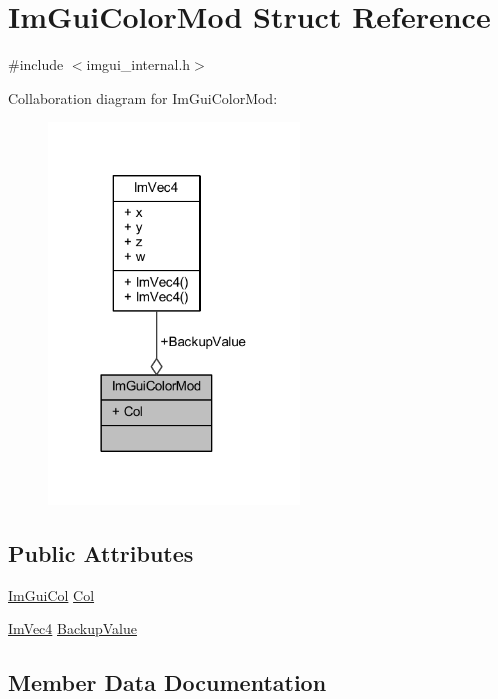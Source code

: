 \hypertarget{struct_im_gui_color_mod}{}\section{Im\+Gui\+Color\+Mod Struct Reference}
\label{struct_im_gui_color_mod}


{\ttfamily \#include $<$imgui\+\_\+internal.\+h$>$}



Collaboration diagram for Im\+Gui\+Color\+Mod\+:
\nopagebreak
\begin{figure}[H]
\begin{center}
\leavevmode
\includegraphics[width=189pt]{struct_im_gui_color_mod__coll__graph}
\end{center}
\end{figure}
\subsection*{Public Attributes}
\begin{DoxyCompactItemize}
\item 
\mbox{\hyperlink{imgui_8h_a1b0467ec582e731ae6292fef726fb5fe}{Im\+Gui\+Col}} \mbox{\hyperlink{struct_im_gui_color_mod_a211171bd30d39348fc9b91289d253e1c}{Col}}
\item 
\mbox{\hyperlink{struct_im_vec4}{Im\+Vec4}} \mbox{\hyperlink{struct_im_gui_color_mod_a99134f8cabbe0c2c45bf7d693bd6dae7}{Backup\+Value}}
\end{DoxyCompactItemize}


\subsection{Member Data Documentation}
\mbox{\label{struct_im_gui_color_mod_a99134f8cabbe0c2c45bf7d693bd6dae7}} 
